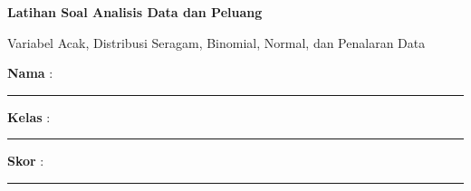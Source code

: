 \documentclass[a4paper,11pt]{article}
\newcounter{no}
\begin{document}
\thispagestyle{fancy}

\begin{center}
  {\color{mainc}\fontsize{22}{26}\selectfont\bfseries Latihan Soal Analisis Data dan Peluang\par}
  \vspace{2pt}
  {\color{accc}\large Variabel Acak, Distribusi Seragam, Binomial, Normal, dan Penalaran Data\par}
\end{center}
\vspace{2pt}
\begin{tcolorbox}[colback=softbg,colframe=mainc!40,boxrule=0.6pt,arc=3pt,left=8pt,right=8pt,top=5pt,bottom=5pt]
\noindent\textbf{Nama} : \rule{4.6cm}{0.4pt}\hfill\textbf{Kelas} : \rule{2.2cm}{0.4pt}\hfill\textbf{Skor} : \rule{2.2cm}{0.4pt}
\end{tcolorbox}
\vspace{2pt}
\end{document}
